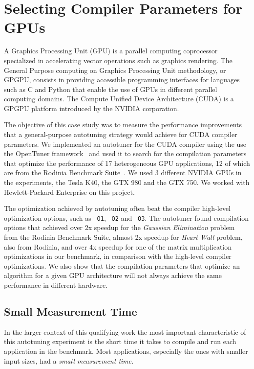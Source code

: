 \section{Selecting Compiler Parameters for GPUs}
\label{sec:paramSelGPU}

A Graphics Processing Unit (GPU) is a parallel computing coprocessor
specialized in accelerating vector operations such as graphics rendering. The
General Purpose computing on Graphics Processing Unit methodology, or GPGPU,
consists in providing accessible programming interfaces for languages such as C
and Python that enable the use of GPUs in different parallel computing domains.
The Compute Unified Device Architecture (CUDA) is a GPGPU platform introduced
by the NVIDIA corporation.

The objective of this case study was to measure the performance improvements
that a general-purpose autotuning strategy would achieve for CUDA compiler
parameters. We implemented an autotuner for the CUDA compiler using the use the
OpenTuner framework~\cite{ansel2014opentuner} and used it to search for the
compilation parameters that optimize the performance of 17 heterogeneous GPU
applications, 12 of which are from the Rodinia Benchmark
Suite~\cite{che2009rodinia}.  We used 3 different NVIDIA GPUs in the
experiments, the Tesla K40, the GTX 980 and the GTX 750. We worked with
Hewlett-Packard Enterprise on this project.

The optimization achieved by autotuning often beat the compiler high-level
optimization options, such as \texttt{-O1}, \texttt{-O2} and \texttt{-O3}.  The
autotuner found compilation options that achieved over 2x speedup for the
\textit{Gaussian Elimination} problem from the Rodinia Benchmark Suite, almost
2x speedup for \emph{Heart Wall} problem, also from Rodinia, and over 4x
speedup for one of the matrix multiplication optimizations in our benchmark, in
comparison with the high-level compiler optimizations.  We also show that the
compilation parameters that optimize an algorithm for a given GPU architecture
will not always achieve the same performance in different hardware.

\subsection{Small Measurement Time}
\label{subsec:smalltime}

In the larger context of this qualifying work the most important characteristic
of this autotuning experiment is the short time it takes to compile and run
each application in the benchmark. Most applications, especially the ones with
smaller input sizes, had a \textit{small measurement time}.

